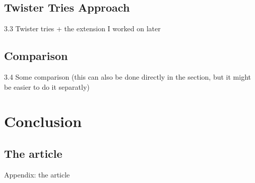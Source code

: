 \documentclass[utf8,english]{gradu3}
\begin{document}
\section{Twister Tries Approach}
3.3 Twister tries + the extension I worked on later

\section{Comparison}
3.4 Some comparison (this can also be done directly in the section, but it might be easier to do it separatly)

\chapter{Conclusion}

\printbibliography






\appendix

\section{The article}
Appendix: the article
\end{document}
